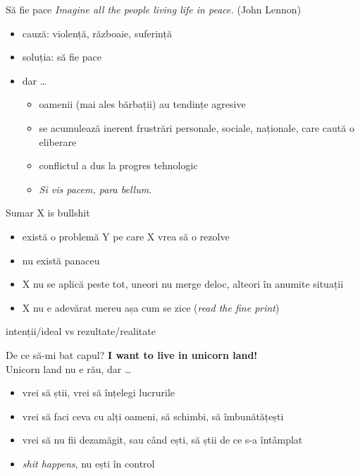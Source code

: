 \documentclass{beamer}
\begin{document}
\begin{frame}{Să fie pace}
  \textit{Imagine all the people living life in peace.} (John Lennon) \\
  \begin{itemize}
    \pause \item cauză: violență, războaie, suferință
    \pause \item soluția: să fie pace
    \pause \item dar \ldots
      \begin{itemize}
        \pause \item oamenii (mai ales bărbații) au tendințe agresive
        \pause \item se acumulează inerent frustrări personale, sociale, naționale, care caută o eliberare
        \pause \item conflictul a dus la progres tehnologic
        \pause \item \textit{Si vis pacem, para bellum.}
      \end{itemize}
  \end{itemize}
\end{frame}

\begin{frame}{Sumar}
  \pause X is bullshit
  \begin{itemize}
    \pause \item există o problemă Y pe care X vrea să o rezolve
    \pause \item nu există panaceu
    \pause \item X nu se aplică peste tot, uneori nu merge deloc, alteori în anumite situații
    \pause \item X nu e adevărat mereu așa cum se zice (\textit{read the fine print})
  \end{itemize}
  \pause intenții/ideal vs rezultate/realitate
\end{frame}

\begin{frame}{De ce să-mi bat capul?}
  \pause \textbf{I want to live in unicorn land!}\\
  \vspace{1cm}
  \pause Unicorn land nu e rău, dar \ldots
  \begin{itemize}
    \pause \item vrei să știi, vrei să înțelegi lucrurile
    \pause \item vrei să faci ceva cu alți oameni, să schimbi, să îmbunătățești
    \pause \item vrei să nu fii dezamăgit, sau când ești, să știi de ce s-a întâmplat
    \pause \item \textit{shit happens}, nu ești în control
  \end{itemize}
\end{frame}
\end{document}
